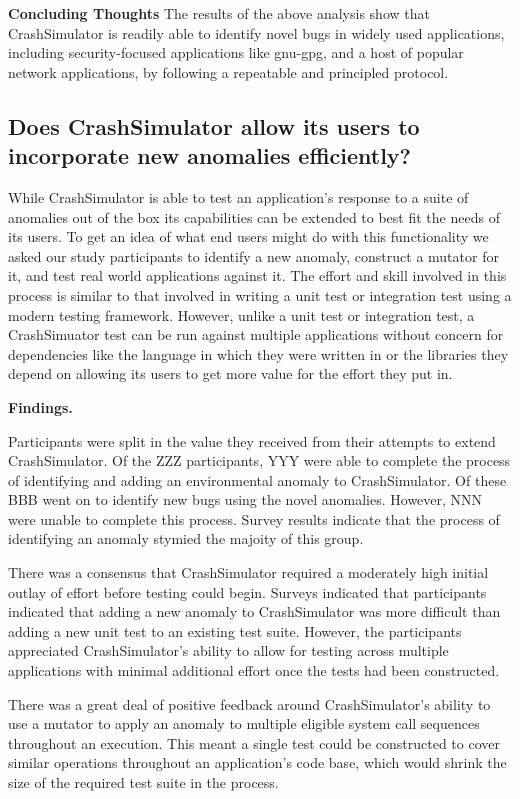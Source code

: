 {\bf Concluding Thoughts} The results of the above analysis show that
CrashSimulator is readily able to identify novel bugs in widely used
applications, including security-focused applications like gnu-gpg, and a host
of popular network applications, by following a repeatable and principled
protocol.


\subsection{Does CrashSimulator allow its users to incorporate new
anomalies efficiently?}

While CrashSimulator is able to test an application's response to a suite
of anomalies out of the box its capabilities can be extended to best fit
the needs of its users.  To get an idea of what end users might do with
this functionality we asked our study participants to identify a new
anomaly, construct a mutator for it, and test real world applications
against it.
The effort and skill involved in
this process is similar to that involved in writing a unit test or
integration test using a modern testing framework.  However, unlike a unit
test or integration test, a CrashSimuator test can be run
against multiple
applications without concern for dependencies like the language in which
they were
written in or the libraries they depend on allowing its users to get more
value for the effort they put in.


{\bf Findings. }

Participants were split in the value they received
from their attempts to extend
CrashSimulator.  Of the ZZZ participants, YYY were able to complete the
process of identifying and adding an environmental anomaly to
CrashSimulator.  Of these BBB went on to identify new bugs using the novel
anomalies.  However, NNN were unable to complete this process.  Survey
results indicate that the process of identifying an anomaly stymied the
majoity of this group.

There was a consensus that
CrashSimulator required a
moderately high initial outlay of effort before testing could begin.
Surveys indicated that participants indicated that
adding a new anomaly to
CrashSimulator was more difficult than adding a new unit test to an
existing test suite.
However, the participants
appreciated
CrashSimulator's ability to allow for
testing
across multiple applications
with minimal additional effort once the tests had been constructed.

There was a great deal of
positive feedback around CrashSimulator's ability to use a mutator to apply
an anomaly to multiple eligible system call sequences throughout an
execution.  This meant a single test could be constructed to cover similar
operations throughout an application's code base, which would
shrink the size of the
required test suite in the process.


